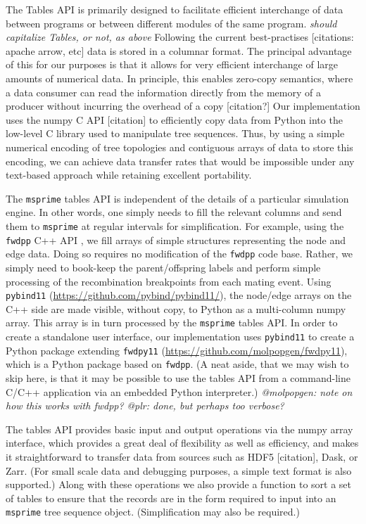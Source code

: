 \documentclass{article}
\newcommand{\fwdpp}{\texttt{fwdpp}}
\newcommand{\msprime}{\texttt{msprime}}
\newcommand{\krt}[1]{{\em \color{green} #1}}
\newcommand{\plr}[1]{{\em \color{blue} #1}}
\newcommand{\jda}[1]{{\em \color{cyan} #1}}
\begin{document}
The Tables API is primarily designed to facilitate efficient interchange of
data between programs or between different modules of the same program.
\jda{should capitalize Tables, or not, as above}
Following the current best-practises [citations: apache arrow, etc] data is stored
in a columnar format.
The principal advantage of this for our purposes is that it allows for very efficient
interchange of large amounts of numerical data. In principle, this enables
zero-copy semantics, where a data consumer can read the information directly
from the memory of a producer without incurring the overhead of a copy
[citation?] Our implementation uses the numpy C API [citation] to efficiently copy
data from Python into the low-level C library used to manipulate
tree sequences.
Thus, by using a simple numerical
encoding of tree topologies and contiguous arrays of data to store this
encoding, we can achieve data transfer rates that would be impossible under
any text-based approach while retaining excellent portability.


The \msprime{} tables API is independent of the details of a particular simulation engine.  In other words, one simply
needs to fill the relevant columns and send them to \msprime{} at regular intervals for simplification.  For example,
using the \fwdpp{} C++ API \cite{Thornton2014-hx}, we fill arrays of simple structures representing the node and edge data.
Doing so requires no modification of the \fwdpp{} code base.  Rather, we simply need to book-keep the parent/offspring
labels and perform simple processing of the recombination breakpoints from each mating event.  Using \texttt{pybind11}
(\url{https://github.com/pybind/pybind11/}),
the node/edge arrays on
the C++ side are made visible, without copy, to Python as a multi-column numpy array. This array is in turn processed by
the \msprime{} tables API.  In order to create a standalone user interface, our implementation uses \texttt{pybind11} to
create a Python package extending \texttt{fwdpy11} (\url{https://github.com/molpopgen/fwdpy11}), which is a Python
package based on \fwdpp{}.  (A neat aside, that we may wish to skip here, is that it may be possible to use the tables
API from a command-line C/C++ application via an embedded Python interpreter.)
\plr{@molpopgen: note on how this works with fwdpp?}
\krt{@plr: done, but perhaps too verbose?}

The tables API provides basic input and output operations via the numpy
array interface, which provides a great deal of flexibility as well
as efficiency, and makes it straightforward to transfer data from sources
such as HDF5 [citation], Dask, or Zarr. 
(For small scale data and debugging purposes, a simple text format is also supported.)
Along with these operations we also provide a function to sort a set of tables
to ensure that the records are in the form required to input
into an \msprime{} tree sequence object. (Simplification may also be required.)
\end{document}
